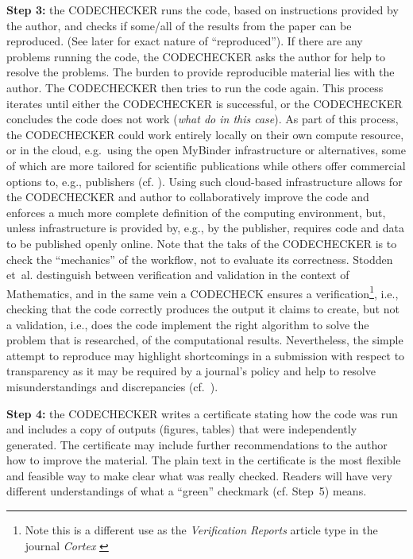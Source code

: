 \documentclass[12pt]{article}
\begin{document}
\textbf{Step 3:} the CODECHECKER runs the code, based on instructions provided by
the author, and checks if some/all of the results from the paper can be
reproduced. (See later for exact nature of ``reproduced''). If there are
any problems running the code, the CODECHECKER asks the author for help
to resolve the problems. The burden to provide reproducible material lies with
the author.
The CODECHECKER then tries to run the code again.
This process iterates until either the CODECHECKER is successful,
or the CODECHECKER concludes the code does not work (\emph{what do in this
case}). As part of this process, the CODECHECKER could work entirely
locally on their own compute resource, or in the cloud, e.g.~using the open
MyBinder infrastructure \cite{jupyter_binder_2018} or alternatives, some of which
are more tailored for scientific publications while others offer commercial
options to, e.g., publishers (cf. \cite{konkol_publishing_2020}).
Using such cloud-based 
infrastructure allows for the CODECHECKER and author to collaboratively improve
the code and enforces a much more complete definition of the computing environment,
but, unless infrastructure is provided by, e.g., by the publisher, requires code
and data to be published openly online.
Note that the taks of the CODECHECKER is to check the ``mechanics'' of the
workflow, not to evaluate its correctness. 
Stodden et~al. \cite{stodden_setting_2013} destinguish between verification and
validation in the context of Mathematics, and in the same vein a CODECHECK
ensures a verification\footnote{Note this is a different use as the \emph{Verification Reports} article type in the journal \emph{Cortex}
\cite{chambers_verification_2020}},
i.e., checking that the code correctly produces the 
output it claims to create, but not a validation, i.e., does the code implement
the right algorithm to solve the problem that is researched, 
of the computational results.
Nevertheless, the simple attempt to reproduce may highlight shortcomings in
a submission with respect to transparency as it may be required by a journal's
policy and help to resolve misunderstandings and discrepancies
(cf.~\cite{christian_journal_2020}).

\textbf{Step 4:} the CODECHECKER writes a certificate stating how the code was
run and includes a copy of outputs (figures, tables) that were
independently generated. The certificate may include further recommendations to
the author how to improve the material.
The plain text in the certificate is the most flexible and feasible way to 
make clear what was really checked. Readers will have very different 
understandings of what a ``green'' checkmark (cf. Step~5) means.
\end{document}
